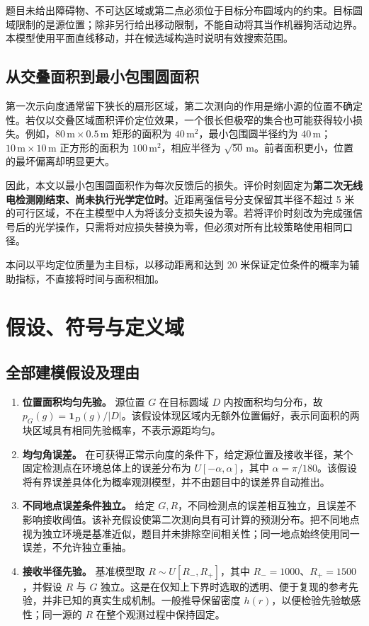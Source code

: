 \documentclass[UTF8,a4paper,zihao=-4,fontset=none]{ctexart}
\numberwithin{equation}{section}
\theoremstyle{definition}
\newcommand{\ind}{\mathbf 1}
\begin{document}
题目未给出障碍物、不可达区域或第二点必须位于目标分布圆域内的约束。目标圆域限制的是源位置；除非另行给出移动限制，不能自动将其当作机器狗活动边界。本模型使用平面直线移动，并在候选域构造时说明有效搜索范围。

\subsection{从交叠面积到最小包围圆面积}
第一次示向度通常留下狭长的扇形区域，第二次测向的作用是缩小源的位置不确定性。若仅以交叠区域面积评价定位效果，一个很长但极窄的集合也可能获得较小损失。例如，\(80\,\mathrm m\times0.5\,\mathrm m\) 矩形的面积为 \(40\,\mathrm m^2\)，最小包围圆半径约为 \(40\,\mathrm m\)；\(10\,\mathrm m\times10\,\mathrm m\) 正方形的面积为 \(100\,\mathrm m^2\)，相应半径为 \(\sqrt{50}\,\mathrm m\)。前者面积更小，位置的最坏偏离却明显更大。

因此，本文以最小包围圆面积作为每次反馈后的损失。评价时刻固定为\textbf{第二次无线电检测刚结束、尚未执行光学定位时}。近距离强信号分支保留其半径不超过 5 米的可行区域，不在主模型中人为将该分支损失设为零。若将评价时刻改为完成强信号后的光学操作，只需将对应损失替换为零，但必须对所有比较策略使用相同口径。

本问以平均定位质量为主目标，以移动距离和达到 20 米保证定位条件的概率为辅助指标，不直接将时间与面积相加。

\section{假设、符号与定义域}
\subsection{全部建模假设及理由}
\begin{enumerate}[label=\textbf{A\arabic*.}]
\item \textbf{位置面积均匀先验。} 源位置 \(G\) 在目标圆域 \(D\) 内按面积均匀分布，故 \(p_G(g)=\ind_D(g)/|D|\)。该假设体现区域内无额外位置偏好，表示同面积的两块区域具有相同先验概率，不表示源距均匀。
\item \textbf{均匀角误差。} 在可获得正常示向度的条件下，给定源位置及接收半径，某个固定检测点在环境总体上的误差分布为 \(U[-\alpha,\alpha]\)，其中 \(\alpha=\pi/180\)。该假设将有界误差具体化为概率观测模型，并不由题目中的误差界自动推出。
\item \textbf{不同地点误差条件独立。} 给定 \(G,R\)，不同检测点的误差相互独立，且误差不影响接收阈值。该补充假设使第二次测向具有可计算的预测分布。把不同地点视为独立环境是基准近似，题目并未排除空间相关性；同一地点始终使用同一误差，不允许独立重抽。
\item \textbf{接收半径先验。} 基准模型取 \(R\sim U[R_-,R_+]\)，其中 \(R_-=1000\)、\(R_+=1500\)，并假设 \(R\) 与 \(G\) 独立。这是在仅知上下界时选取的透明、便于复现的参考先验，并非已知的真实生成机制。一般推导保留密度 \(h(r)\)，以便检验先验敏感性；同一源的 \(R\) 在整个观测过程中保持固定。
\end{enumerate}
\end{document}
